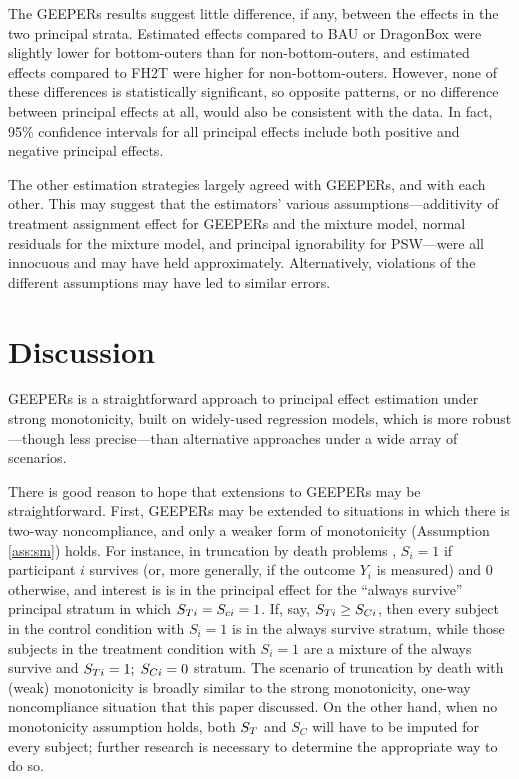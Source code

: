 \documentclass{statsoc} %
\begin{document}
The GEEPERs results suggest little difference, if any, between the effects in the two principal strata. Estimated effects compared to BAU or DragonBox were slightly lower for bottom-outers than for non-bottom-outers, and estimated effects compared to FH2T were higher for non-bottom-outers.
However, none of these differences is statistically significant, so opposite patterns, or no difference between principal effects at all, would also be consistent with the data.
In fact, 95\% confidence intervals for all principal effects include both positive and negative principal effects.

The other estimation strategies largely agreed with GEEPERs, and with each other. 
This may suggest that the estimators' various assumptions---additivity of treatment assignment effect for GEEPERs and the mixture model, normal residuals for the mixture model, and principal ignorability for PSW---were all innocuous and may have held approximately. Alternatively, violations of the different assumptions may have led to similar errors.


\section{Discussion}\label{sec:discussion}
GEEPERs is a straightforward approach to principal effect estimation under strong monotonicity, built on widely-used regression models, which is more robust---though less precise---than alternative approaches under a wide array of scenarios.

There is good reason to hope that extensions to GEEPERs may be straightforward.
First, GEEPERs may be extended to situations in which there is two-way noncompliance, and only a weaker form of monotonicity (Assumption \ref{ass:sm}) holds.
For instance, in truncation by death problems \citep[e.g.][]{zhangRubin,ding2011}, $S_i=1$ if participant $i$ survives (or, more generally, if the outcome $Y_i$ is measured) and 0 otherwise, and interest is is in the principal effect for the ``always survive'' principal stratum in which $S_{Ti}=S_{ci}=1$.
If, say, $S_{Ti}\ge S_{Ci}$, then every subject in the control condition with $S_i=1$ is in the always survive stratum, while those subjects in the treatment condition with $S_i=1$ are a mixture of the always survive and $S_{Ti}=1;\;S_{Ci}=0$ stratum.
The scenario of truncation by death with (weak) monotonicity is broadly similar to the strong monotonicity, one-way noncompliance situation that this paper discussed.
On the other hand, when no monotonicity assumption holds, both $S_T$ and $S_C$ will have to be imputed for every subject; further research is necessary to determine the appropriate way to do so.
\end{document}
